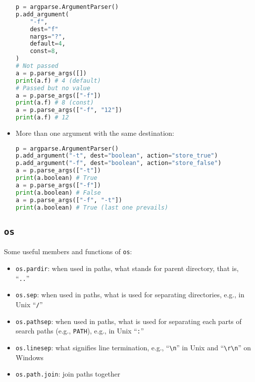 \documentclass[a4paper,12pt,%
              final%
              ]{article}
\begin{document}
\begin{itemize}
    \begin{center}
    \begin{minipage}[T]{.45\textwidth}
        \begin{lstlisting}[language=python,frame=single]
p = argparse.ArgumentParser()
p.add_argument(
    "-f",
    dest="f"
    nargs="?",
    default=4,
    const=8,
)
# Not passed
a = p.parse_args([])
print(a.f) # 4 (default)
# Passed but no value
a = p.parse_args(["-f"])
print(a.f) # 8 (const)
a = p.parse_args(["-f", "12"])
print(a.f) # 12
        \end{lstlisting}
      \end{minipage}
    \end{center}

  \item More than one argument with the same destination:
\begin{lstlisting}[language=python]
p = argparse.ArgumentParser()
p.add_argument("-t", dest="boolean", action="store_true")
p.add_argument("-f", dest="boolean", action="store_false")
a = p.parse_args(["-t"])
print(a.boolean) # True
a = p.parse_args(["-f"])
print(a.boolean) # False
a = p.parse_args(["-f", "-t"])
print(a.boolean) # True (last one prevails)
\end{lstlisting}
\end{itemize}

\subsection{\texttt{os}}
Some useful members and functions of \texttt{os}:
\begin{itemize}
  \item \texttt{os.pardir}: when used in paths, what stands for parent directory, that is, ``\texttt{..}''
  \item \texttt{os.sep}: when used in paths, what is used for separating directories, e.g., in Unix ``\texttt{/}''
  \item \texttt{os.pathsep}: when used in paths, what is used for separating each parts of search paths (e.g., \texttt{PATH}), e.g., in Unix ``\texttt{:}''
  \item \texttt{os.linesep}: what signifies line termination, e.g., ``\verb|\n|'' in Unix and ``\verb|\r\n|'' on Windows
  \item \texttt{os.path.join}: join paths together
\end{itemize}
\end{document}
